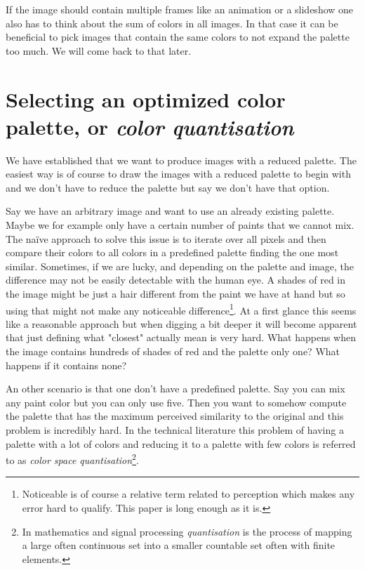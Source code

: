 \documentclass{article}
\begin{document}
If the image should contain multiple frames like an animation or a
slideshow one also has to think about the sum of colors in all images.
In that case it can be beneficial to pick images that contain the same
colors to not expand the palette too much. We will come back to that
later.

\section{Selecting an optimized color palette, or \emph{color quantisation}}

We have established that we want to produce images with a reduced
palette. The easiest way is of course to draw the images with a reduced
palette to begin with and we don't have to reduce the palette but say we
don't have that option.

Say we have an arbitrary image and want to use an already existing
palette. Maybe we for example only have a certain number of paints that
we cannot mix. The naïve approach to solve this issue is to iterate over
all pixels and then compare their colors to all colors in a predefined
palette finding the one most similar. Sometimes, if we are lucky, and
depending on the palette and image, the difference may not be easily
detectable with the human eye. A shades of red in the image might be
just a hair different from the paint we have at hand but so using that
might not make any noticeable difference\footnote{Noticeable is of
  course a relative term related to perception which makes any error
  hard to qualify. This paper is long enough as it is.}. At a first
glance this seems like a reasonable approach but when digging a bit
deeper it will become apparent that just defining what "closest"
actually mean is very hard. What happens when the image contains
hundreds of shades of red and the palette only one? What happens if it contains none?

An other scenario is that one don't have a predefined palette. Say you
can mix any paint color but you can only use five. Then you want to
somehow compute the palette that has the maximum perceived similarity to
the original and this problem is incredibly hard. In the technical literature this
problem of having a palette with a lot of colors and reducing it to a
palette with few colors is referred to as \emph{color space
quantisation}\footnote{In mathematics and signal processing
  \emph{quantisation} is the process of mapping a large often continuous
  set into a smaller countable set often with finite elements.}.
\end{document}
